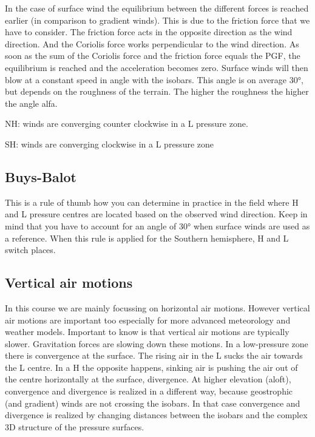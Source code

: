 \documentclass[oneside]{book}
\begin{document}
In the case of surface wind the equilibrium between the different forces
is reached earlier (in comparison to gradient winds). This is due to the
friction force that we have to consider. The friction force acts in the
opposite direction as the wind direction. And the Coriolis force works
perpendicular to the wind direction. As soon as the sum of the Coriolis
force and the friction force equals the PGF, the equilibrium is reached
and the acceleration becomes zero. Surface winds will then blow at a
constant speed in angle with the isobars. This angle is on average 30°,
but depends on the roughness of the terrain. The higher the roughness
the higher the angle alfa.

NH: winds are converging counter clockwise in a L pressure zone.

SH: winds are converging clockwise in a L pressure zone

\subsection{Buys-Balot}\label{buys-balot}

This is a rule of thumb how you can determine in practice in the field
where H and L pressure centres are located based on the observed wind
direction. Keep in mind that you have to account for an angle of 30°
when surface winds are used as a reference. When this rule is applied
for the Southern hemisphere, H and L switch places.

\subsection{Vertical air motions}\label{vertical-air-motions}

In this course we are mainly focussing on horizontal air motions.
However vertical air motions are important too especially for more
advanced meteorology and weather models. Important to know is that
vertical air motions are typically slower. Gravitation forces are
slowing down these motions. In a low-pressure zone there is convergence
at the surface. The rising air in the L sucks the air towards the L
centre. In a H the opposite happens, sinking air is pushing the air out
of the centre horizontally at the surface, divergence. At higher
elevation (aloft), convergence and divergence is realized in a different
way, because geostrophic (and gradient) winds are not crossing the
isobars. In that case convergence and divergence is realized by changing
distances between the isobars and the complex 3D structure of the
pressure surfaces.
\end{document}
